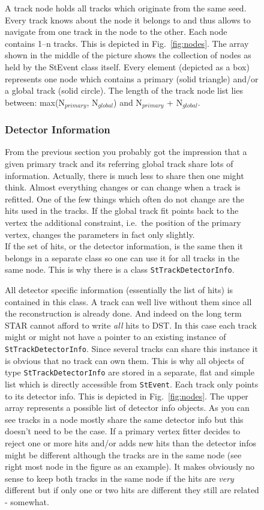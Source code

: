 \documentclass[twoside]{article}
\begin{document}
\begin{figure}[htb]
\begin{center}
A track node holds all tracks which originate from the same seed.
Every track knows about the node it belongs to and thus allows to
navigate from one track in the node to the other.  Each node contains
1--n tracks. This is depicted in Fig.~\ref{fig:nodes}.  The array
shown in the middle of the picture shows the collection of nodes as
held by the StEvent class itself. Every element (depicted as a box)
represents one node which contains a primary (solid triangle) and/or a
global track (solid circle). The length of the track node list lies
between: max(N$_{primary}$, N$_{global}$) and N$_{primary}$ +
N$_{global}$.

\subsubsection{Detector Information}
\label{sec:detInfo}
From the previous section you probably got the impression that a given
primary track and its referring global track share lots of
information.  Actually, there is much less to share then one might
think.  Almost everything changes or can change when a track is
refitted. One of the few things which often do not change are the hits
used in the tracks.  If the global track fit points back to the vertex
the additional constraint, i.e.~the position of the primary
vertex, changes the parameters in fact only slightly. \\
If the set of hits, or the detector information, is the same then it
belongs in a separate class so one can use it for all tracks in the
same node.  This is why there is a class \texttt{StTrackDetectorInfo}.
 
All detector specific information (essentially the list of hits) is
contained in this class.  A track can well live without them since all
the reconstruction is already done.  And indeed on the long term STAR
cannot afford to write \emph{all} hits to DST. In this case each track
might or might not have a pointer to an existing instance of
\texttt{StTrackDetectorInfo}.  Since several tracks can share this
instance it is obvious that no track can own them. This is why all
objects of type \texttt{StTrackDetectorInfo} are stored in a separate,
flat and simple list which is directly accessible from
\texttt{StEvent}. Each track only points to its detector info. This is
depicted in Fig.~\ref{fig:nodes}.  The upper array represents a
possible list of detector info objects.  As you can see tracks in a
node mostly share the same detector info but this doesn't need to be
the case. If a primary vertex fitter decides to reject one or more
hits and/or adds new hits than the detector infos might be different
although the tracks are in the same node (see right most node in the
figure as an example). It makes obviously no sense to keep both tracks
in the same node if the hits are \emph{very} different but if only one
or two hits are different they still are related - somewhat.


\end{center}
\end{figure}
\end{document}
